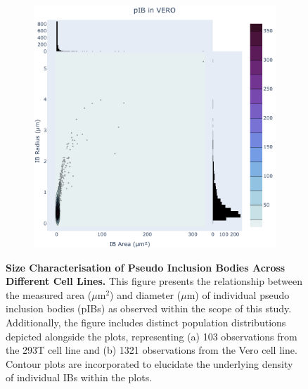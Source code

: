 \begin{figure}
\begin{subfigure}{0.495\textwidth}
        \includegraphics[width=\textwidth]{09. Chapter 4/Figs/01. pIB/01. pIB characterisation/02. heatmap_pib-vero.pdf}
    \end{subfigure}
    \caption[Size Characterisation of Pseudo Inclusion Bodies Across Different Cell Lines.]{\textbf{Size Characterisation of Pseudo Inclusion Bodies Across Different Cell Lines.} This figure presents the relationship between the measured area (\(\mu \mbox{m}^2\)) and diameter (\(\mu \mbox{m}\)) of individual pseudo inclusion bodies (pIBs) as observed within the scope of this study. Additionally, the figure includes distinct population distributions depicted alongside the plots, representing (a) 103 observations from the 293T cell line and (b) 1321 observations from the Vero cell line. Contour plots are incorporated to elucidate the underlying density of individual IBs within the plots.}
    \label{fig:Size Characterisation of Pseudo Inclusion Bodies Across Different Cell Lines}
\end{figure}

